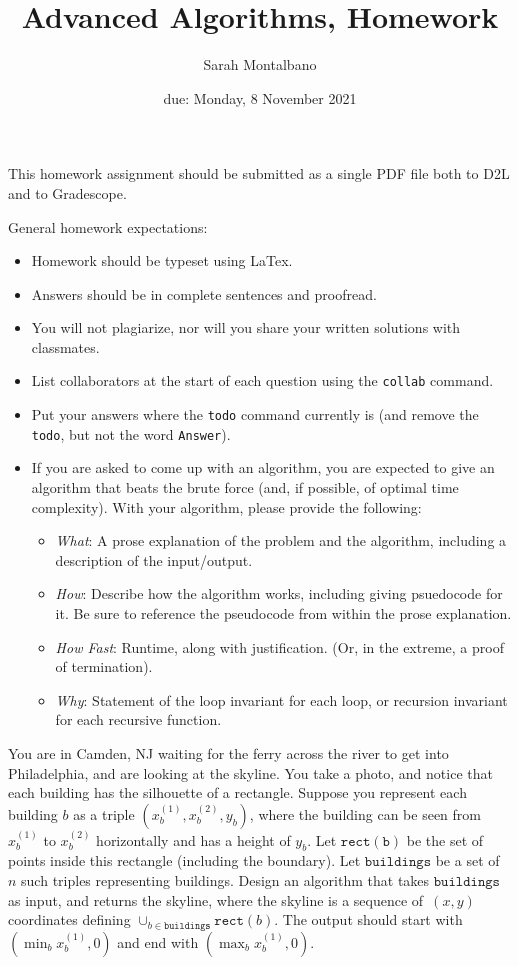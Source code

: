 \documentclass{article}
\title{Advanced Algorithms, Homework \hwnum}
\author{Sarah Montalbano}
\date{due: Monday, 8 November 2021}
\begin{document}
\maketitle

This homework assignment should be
submitted as a single PDF file both to D2L and to Gradescope.

General homework expectations:
\begin{itemize}
    \item Homework should be typeset using LaTex.
    \item Answers should be in complete sentences and proofread.
    \item You will not plagiarize, nor will you share your written solutions
        with classmates.
    \item List collaborators at the start of each question using the
        \texttt{collab} command.
    \item Put your answers where the \texttt{todo} command currently is (and
        remove the \texttt{todo}, but not the word \texttt{Answer}).
    \item If you are asked to come up with an algorithm, you are
        expected to give an algorithm that beats the brute force (and, if possible, of
        optimal time complexity). With your algorithm, please provide the following:
        \begin{itemize}
            \item \emph{What}: A prose explanation of the problem and the algorithm,
                including a description of the input/output.
            \item \emph{How}: Describe how the algorithm works, including giving
                psuedocode for it.  Be sure to reference the pseudocode
                from within the prose explanation.
            \item \emph{How Fast}: Runtime, along with justification.  (Or, in the
                extreme, a proof of termination).
            \item \emph{Why}: Statement of the loop invariant for each loop, or
                recursion invariant for each recursive function.
        \end{itemize}
\end{itemize}

\collab{\todo{}}

You are in Camden, NJ waiting for the ferry across the river to
get into Philadelphia, and are looking at the skyline.  You take a photo, and notice that each building
has the silhouette of a rectangle.  Suppose you  represent each building $b$ as a
triple $(x_b^{(1)},x_b^{(2)},y_b)$, where the building can be seen from $x_b^{(1)}$ to $x_b^{(2)}$
horizontally and has a height of $y_b$.  Let $\mathtt{rect(b)}$ be the set of
points inside this rectangle (including the boundary).  Let $\mathtt{buildings}$
be a set of $n$ such triples representing buildings. Design an algorithm that takes $\mathtt{buildings}$ as input, and
returns the skyline, where the skyline is a sequence of~$(x,y)$ coordinates
defining $\cup_{b \in \mathtt{buildings}} \mathtt{rect}(b)$.  The output should
start with $(\min_b{x_b^{(1)}},0)$ and end with $(\max_b{x_b^{(1)}},0)$.
\end{document}
